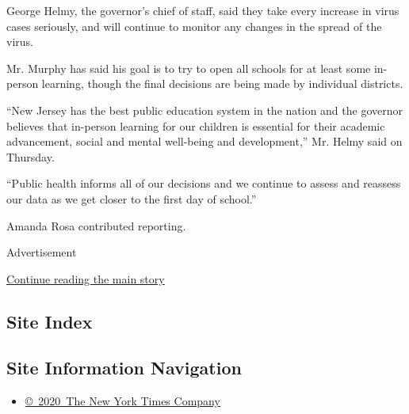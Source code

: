 George Helmy, the governor's chief of staff, said they take every
increase in virus cases seriously, and will continue to monitor any
changes in the spread of the virus.

Mr. Murphy has said his goal is to try to open all schools for at least
some in-person learning, though the final decisions are being made by
individual districts.

``New Jersey has the best public education system in the nation and the
governor believes that in-person learning for our children is essential
for their academic advancement, social and mental well-being and
development,'' Mr. Helmy said on Thursday.

``Public health informs all of our decisions and we continue to assess
and reassess our data as we get closer to the first day of school.''

Amanda Rosa contributed reporting.

Advertisement

\protect\hyperlink{after-bottom}{Continue reading the main story}

\hypertarget{site-index}{%
\subsection{Site Index}\label{site-index}}

\hypertarget{site-information-navigation}{%
\subsection{Site Information
Navigation}\label{site-information-navigation}}

\begin{itemize}
\tightlist
\item
  \href{https://help.nytimes.com/hc/en-us/articles/115014792127-Copyright-notice}{©~2020~The
  New York Times Company}
\end{itemize}

